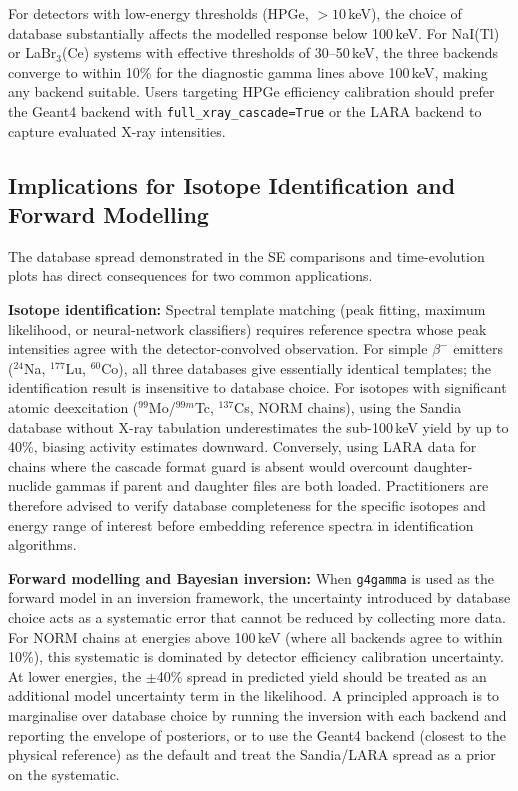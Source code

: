 \documentclass[journal]{IEEEtran}
\begin{document}
For detectors with low-energy thresholds (HPGe, $>10$\,keV), the choice of
database substantially affects the modelled response below 100\,keV.
For NaI(Tl) or LaBr$_3$(Ce) systems with effective thresholds of 30--50\,keV,
the three backends converge to within 10\% for the diagnostic gamma lines above
100\,keV, making any backend suitable.
Users targeting HPGe efficiency calibration should prefer the Geant4 backend
with \texttt{full\_xray\_cascade=True} or the LARA backend to capture evaluated
X-ray intensities.

\subsection{Implications for Isotope Identification and Forward Modelling}

The database spread demonstrated in the SE comparisons and time-evolution plots
has direct consequences for two common applications.

\textbf{Isotope identification:} Spectral template matching (peak fitting, maximum
likelihood, or neural-network classifiers) requires reference spectra whose
peak intensities agree with the detector-convolved observation.
For simple $\beta^-$ emitters ($^{24}$Na, $^{177}$Lu, $^{60}$Co), all three
databases give essentially identical templates; the identification result is
insensitive to database choice.
For isotopes with significant atomic deexcitation ($^{99}$Mo/$^{99m}$Tc,
$^{137}$Cs, NORM chains), using the Sandia database without X-ray tabulation
underestimates the sub-100\,keV yield by up to 40\%, biasing activity estimates
downward.
Conversely, using LARA data for chains where the cascade format guard is
absent would overcount daughter-nuclide gammas if parent and daughter files are
both loaded.
Practitioners are therefore advised to verify database completeness for the
specific isotopes and energy range of interest before embedding reference spectra
in identification algorithms.

\textbf{Forward modelling and Bayesian inversion:} When \texttt{g4gamma} is used
as the forward model in an inversion framework, the uncertainty introduced by
database choice acts as a systematic error that cannot be reduced by collecting
more data.
For NORM chains at energies above 100\,keV (where all backends agree to within
10\%), this systematic is dominated by detector efficiency calibration uncertainty.
At lower energies, the $\pm$40\% spread in predicted yield should be treated as
an additional model uncertainty term in the likelihood.
A principled approach is to marginalise over database choice by running the
inversion with each backend and reporting the envelope of posteriors, or to use
the Geant4 backend (closest to the physical reference) as the default and treat
the Sandia/LARA spread as a prior on the systematic.
\end{document}
